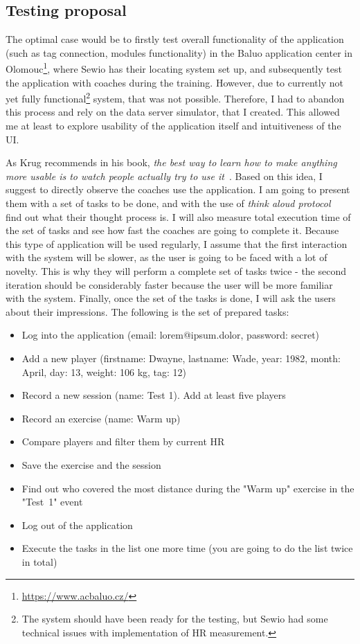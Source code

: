 \subsection{Testing proposal}
The optimal case would be to firstly test overall functionality of the application (such as tag connection, modules functionality) in the Baluo application center in Olomouc\footnote{\url{https://www.acbaluo.cz/}}, where Sewio has their locating system set up, and subsequently test the application with coaches during the training. However, due to currently not yet fully functional\footnote{The system should have been ready for the testing, but Sewio had some technical issues with implementation of HR measurement.} system, that was not possible. Therefore, I had to abandon this process and rely on the data server simulator, that I created. This allowed me at least to explore usability of the application itself and intuitiveness of the UI.

As Krug recommends in his book, \textit{the best way to learn how to make anything more usable is to watch people actually try to use it}~\cite{Krug}. Based on this idea, I suggest to directly observe the coaches use the application. I am going to present them with a set of tasks to be done, and with the use of \textit{think aloud protocol}~\cite{ThinkAloud} find out what their thought process is. I will also measure total execution time of the set of tasks and see how fast the coaches are going to complete it. Because this type of application will be used regularly, I assume that the first interaction with the system will be slower, as the user is going to be faced with a lot of novelty. This is why they will perform a complete set of tasks twice - the second iteration should be considerably faster because the user will be more familiar with the system. Finally, once the set of the tasks is done, I will ask the users about their impressions. The following is the set of prepared tasks:

\begin{itemize}
\item Log into the application (email: lorem@ipsum.dolor, password: secret)
\item Add a new player (firstname: Dwayne, lastname: Wade, year: 1982, month: April, day: 13, weight: 106 kg, tag: 12)
\item Record a new session (name: Test 1). Add at least five players
\item Record an exercise (name: Warm up)
\item Compare players and filter them by current HR
\item Save the exercise and the session
\item Find out who covered the most distance during the "Warm up" exercise in the "Test~1" event
\item Log out of the application
\item Execute the tasks in the list one more time (you are going to do the list twice in total)
\end{itemize}

